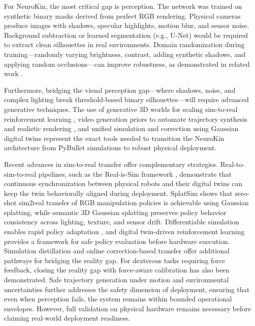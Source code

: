 \documentclass[12pt,a4paper,oneside]{report}
\begin{document}
For NeuroKin, the most critical gap is perception. The network was trained on synthetic binary masks derived from perfect RGB rendering. Physical cameras produce images with shadows, specular highlights, motion blur, and sensor noise. Background subtraction or learned segmentation (e.g., U-Net) would be required to extract clean silhouettes in real environments. Domain randomization during training—randomly varying brightness, contrast, adding synthetic shadows, and applying random occlusions—can improve robustness, as demonstrated in related work \cite{rezvani2024robust, qiu2024swim2real}.

Furthermore, bridging the visual perception gap—where shadows, noise, and complex lighting break threshold-based binary silhouettes—will require advanced generative techniques. The use of generative 3D worlds for scaling sim-to-real reinforcement learning \cite{choi2025scalingsim}, video generation priors to automate trajectory synthesis and realistic rendering \cite{he2025vdreamer}, and unified simulation and correction using Gaussian digital twins \cite{cai2025gausstwin} represent the exact tools needed to transition the NeuroKin architecture from PyBullet simulations to robust physical deployment.

Recent advances in sim-to-real transfer offer complementary strategies. Real-to-sim-to-real pipelines, such as the Real-is-Sim framework \cite{torne2024rialto}, demonstrate that continuous synchronization between physical robots and their digital twins can keep the twin behaviorally aligned during deployment. SplatSim \cite{qureshi2025splatsim} shows that zero-shot sim2real transfer of RGB manipulation policies is achievable using Gaussian splatting, while semantic 3D Gaussian splatting \cite{tang2025semantic} preserves policy behavior consistency across lighting, texture, and sensor drift. Differentiable simulation enables rapid policy adaptation \cite{pan2025learningfly}, and digital twin-driven reinforcement learning \cite{xu2025twinrl} provides a framework for safe policy evaluation before hardware execution. Simulation distillation \cite{levy2024simdist} and online correction-based transfer \cite{jiang2024transic} offer additional pathways for bridging the reality gap. For dexterous tasks requiring force feedback, closing the reality gap with force-aware calibration \cite{bytedance2025closing} has also been demonstrated. Safe trajectory generation under motion and environmental uncertainties \cite{meng2026riskbounded} further addresses the safety dimension of deployment, ensuring that even when perception fails, the system remains within bounded operational envelopes. However, full validation on physical hardware remains necessary before claiming real-world deployment readiness.
\end{document}
